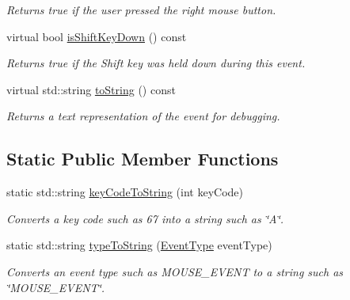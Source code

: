\begin{DoxyCompactItemize}
\begin{DoxyCompactList}\small\item\em Returns true if the user pressed the right mouse button. \end{DoxyCompactList}\item 
virtual bool \mbox{\hyperlink{classsgl_1_1GEvent_a814434d4ee5d0792e2c9ffdf8433766c}{is\+Shift\+Key\+Down}} () const
\begin{DoxyCompactList}\small\item\em Returns {\ttfamily true} if the Shift key was held down during this event. \end{DoxyCompactList}\item 
virtual std\+::string \mbox{\hyperlink{classsgl_1_1GEvent_a1fe5121d6528fdea3f243321b3fa3a49}{to\+String}} () const
\begin{DoxyCompactList}\small\item\em Returns a text representation of the event for debugging. \end{DoxyCompactList}\end{DoxyCompactItemize}
\subsection*{Static Public Member Functions}
\begin{DoxyCompactItemize}
\item 
static std\+::string \mbox{\hyperlink{classsgl_1_1GEvent_a6e882459d29785fb753a3bf23f29cbc3}{key\+Code\+To\+String}} (int key\+Code)
\begin{DoxyCompactList}\small\item\em Converts a key code such as 67 into a string such as \char`\"{}\+A\char`\"{}. \end{DoxyCompactList}\item 
static std\+::string \mbox{\hyperlink{classsgl_1_1GEvent_abfc45737c7f2e261401203a0c959c103}{type\+To\+String}} (\mbox{\hyperlink{namespacesgl_a2628ea8d12e8b2563c32f05dc7fff6fa}{Event\+Type}} event\+Type)
\begin{DoxyCompactList}\small\item\em Converts an event type such as M\+O\+U\+S\+E\+\_\+\+E\+V\+E\+NT to a string such as \char`\"{}\+M\+O\+U\+S\+E\+\_\+\+E\+V\+E\+N\+T\char`\"{}. \end{DoxyCompactList}\end{DoxyCompactItemize}
